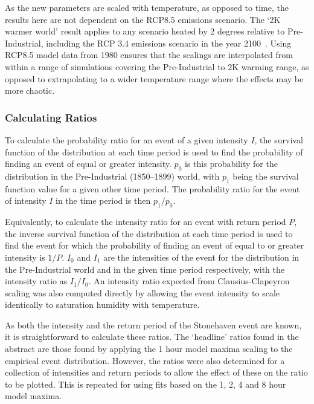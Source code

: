 As the new parameters are scaled with temperature,
    as opposed to time,
    the results here are not dependent on the RCP8.5 emissions scenario.
The `2K warmer world' result applies to any scenario heated by 2 degrees relative to Pre-Industrial,
    including the RCP 3.4 emissions scenario in the year 2100~\cite{Pielke_2021}.
Using RCP8.5 model data from 1980 ensures that the scalings are interpolated from within a range of simulations
    covering the Pre-Industrial to 2K warming range,
    as opposed to extrapolating to a wider temperature range where the effects may be more chaotic.

\subsubsection{Calculating Ratios}

To calculate the probability ratio for an event of a given intensity $I$,
    the survival function of the distribution at each time period is used to find the probability of finding an event of equal or greater intensity.
$p_0$ is this probability for the distribution in the Pre-Industrial (1850--1899) world,
    with $p_1$ being the survival function value for a given other time period.
The probability ratio for the event of intensity $I$ in the time period is then $p_1/p_0$.

Equivalently, to calculate the intensity ratio for an event with return period $P$,
    the inverse survival function of the distribution at each time period is used to find the event for which the probability of finding an event of equal to or greater intensity is $1/P$.
$I_0$ and $I_1$ are the intensities of the event for the distribution in the Pre-Industrial world and in the given time period respectively,
    with the intensity ratio as $I_1/I_0$.
An intensity ratio expected from Clausius-Clapeyron scaling was also computed directly by allowing the event intensity to scale identically to saturation humidity with temperature.

As both the intensity and the return period of the Stonehaven event are known,
    it is straightforward to calculate these ratios.
The `headline' ratios found in the abstract are those found by applying the 1 hour model maxima scaling to the empirical event distribution.
However, the ratios were also determined for a collection of intensities and return periods to allow the effect of these on the ratio to be plotted.
This is repeated for using fits based on the 1, 2, 4 and 8 hour model maxima.

